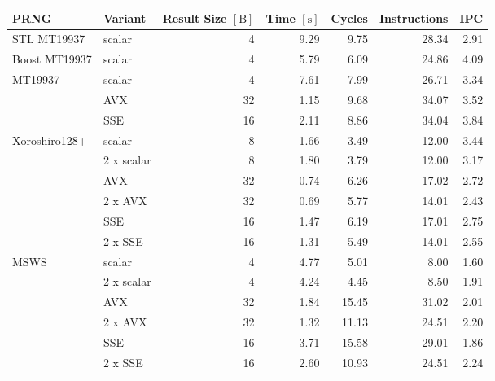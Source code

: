 \documentclass{stdlocal}
\begin{document}
\begin{tabular}{llrrrrr}
  \hline
  \textbf{PRNG} & \textbf{Variant} & \textbf{Result Size} $[\mathrm{B}]$ & \textbf{Time} $[\mathrm{s}]$ & \textbf{Cycles} & \textbf{Instructions} & \textbf{IPC} \\
  \hline
  \hline
  STL MT19937 & scalar & 4 & 9.29 & 9.75 & 28.34 & 2.91 \\
  \hline
  Boost MT19937 & scalar & 4 & 5.79 & 6.09 & 24.86 & 4.09 \\
  \hline
  \multirow{3}{*}{MT19937}
  & scalar & 4 & 7.61 & 7.99 & 26.71 & 3.34 \\
  & AVX & 32 & 1.15 & 9.68 & 34.07 & 3.52 \\
  & SSE & 16 & 2.11 & 8.86 & 34.04 & 3.84 \\
  \hline
  \multirow{6}{*}{Xoroshiro128+}
  & scalar & 8 & 1.66 & 3.49 & 12.00 & 3.44 \\
  & 2 x scalar & 8 & 1.80 & 3.79 & 12.00 & 3.17 \\
  & AVX & 32 & 0.74 & 6.26 & 17.02 & 2.72 \\
  & 2 x AVX & 32 & 0.69 & 5.77 & 14.01 & 2.43 \\
  & SSE & 16 & 1.47 & 6.19 & 17.01 & 2.75 \\
  & 2 x SSE & 16 & 1.31 & 5.49 & 14.01 & 2.55 \\
  \hline
  \multirow{6}{*}{MSWS}
  & scalar & 4 & 4.77 & 5.01 & 8.00 & 1.60 \\
  & 2 x scalar & 4 & 4.24 & 4.45 & 8.50 & 1.91 \\
  & AVX & 32 & 1.84 & 15.45 & 31.02 & 2.01 \\
  & 2 x AVX & 32 & 1.32 & 11.13 & 24.51 & 2.20 \\
  & SSE & 16 & 3.71 & 15.58 & 29.01 & 1.86 \\
  & 2 x SSE & 16 & 2.60 & 10.93 & 24.51 & 2.24 \\
  \hline
\end{tabular}
\end{document}
